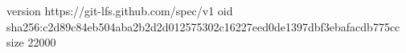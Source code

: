 version https://git-lfs.github.com/spec/v1
oid sha256:c2d89c84eb504aba2b2d2d012575302c16227eed0de1397dbf3ebafacdb775cc
size 22000
